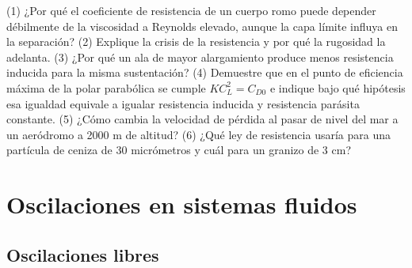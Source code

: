 \documentclass[10pt,openany]{book}
\begin{document}
\begin{tcolorbox}[title={Autoevaluación}, studiumcheck, breakable]

(1) ¿Por qué el coeficiente de resistencia de un cuerpo romo puede depender débilmente de la viscosidad a Reynolds elevado, aunque la capa límite influya en la separación? (2) Explique la crisis de la resistencia y por qué la rugosidad la adelanta. (3) ¿Por qué un ala de mayor alargamiento produce menos resistencia inducida para la misma sustentación? (4) Demuestre que en el punto de eficiencia máxima de la polar parabólica se cumple \(K C_L^2=C_{D0}\) e indique bajo qué hipótesis esa igualdad equivale a igualar resistencia inducida y resistencia parásita constante. (5) ¿Cómo cambia la velocidad de pérdida al pasar de nivel del mar a un aeródromo a 2000 m de altitud? (6) ¿Qué ley de resistencia usaría para una partícula de ceniza de 30 micrómetros y cuál para un granizo de 3 cm?
\end{tcolorbox}
\studiumchaptercheck

\chapter{Oscilaciones en sistemas fluidos}
\label{chap:c08}


\section{Oscilaciones libres}
\end{document}

